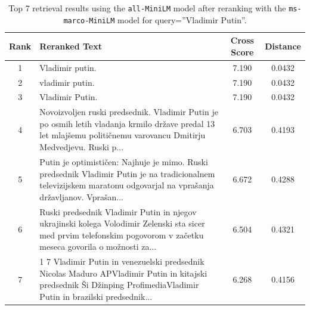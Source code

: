 \documentclass[conference]{IEEEtran}
\begin{document}
\begin{table}[h]
\centering
\small
\begin{tabular}{|c|p{13cm}|c|c|}
\hline
\textbf{Rank} & \textbf{Reranked Text} & \textbf{Cross Score} & \textbf{Distance} \\
\hline
1 & Vladimir putin. & 7.190 & 0.0432 \\
\hline
2 & vladimir putin. & 7.190 & 0.0432 \\
\hline
3 & Vladimir Putin. & 7.190 & 0.0432 \\
\hline
4 & Novoizvoljen ruski predsednik. Vladimir Putin je po osmih letih vladanja krmilo države predal 13 let mlajšemu političnemu varovancu Dmitirju Medvedjevu. Ruski p... & 6.703 & 0.4193 \\
\hline
5 & Putin je optimističen: Najhuje je mimo. Ruski predsednik Vladimir Putin je na tradicionalnem televizijskem maratonu odgovarjal na vprašanja državljanov. Vprašan... & 6.672 & 0.4288 \\
\hline
6 & Ruski predsednik Vladimir Putin in njegov ukrajinski kolega Volodimir Zelenski sta sicer med prvim telefonskim pogovorom v začetku meseca govorila o možnosti za... & 6.504 & 0.4321 \\
\hline
7 & 1 7 Vladimir Putin in venezuelski predsednik Nicolas Maduro APVladimir Putin in kitajski predsednik Ši Džinping ProfimediaVladimir Putin in brazilski predsednik... & 6.268 & 0.4156 \\
\hline
\end{tabular}
\caption{Top 7 retrieval results using the \texttt{all-MiniLM} model after reranking with the \texttt{ms-marco-MiniLM} model for query=''Vladimir Putin''.}
\label{tab:short_query_reranked_low_end}
\end{table}
\end{document}
